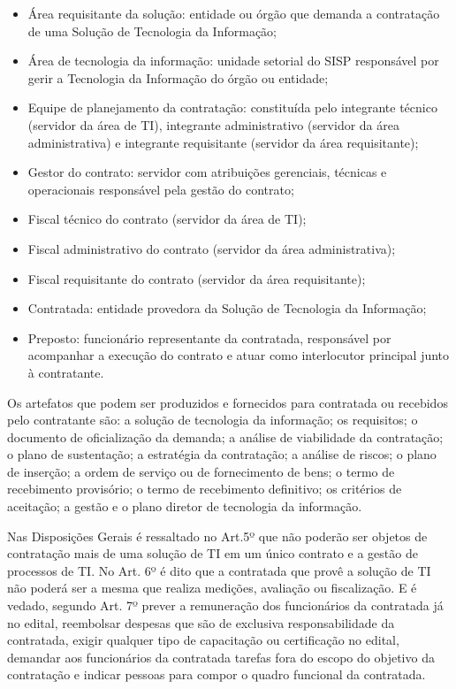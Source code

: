 \begin{itemize}
\item Área requisitante da solução: entidade ou órgão que demanda a contratação de uma Solução de Tecnologia da Informação; 
\item Área de tecnologia da informação: unidade setorial do SISP responsável por gerir a Tecnologia da Informação do órgão ou entidade;
\item Equipe de planejamento da contratação: constituída pelo integrante técnico (servidor da área de TI), integrante administrativo (servidor da área administrativa) e integrante requisitante (servidor da área requisitante);
\item Gestor do contrato: servidor com atribuições gerenciais, técnicas e operacionais responsável pela gestão do contrato; 
\item Fiscal técnico do contrato (servidor da área de TI); 
\item Fiscal administrativo do contrato (servidor da área administrativa); 
\item Fiscal requisitante do contrato (servidor da área requisitante);
\item Contratada: entidade provedora da Solução de Tecnologia da Informação;
\item Preposto: funcionário representante da contratada, responsável por acompanhar a execução do contrato e atuar como interlocutor principal junto à contratante.
\end{itemize}

Os artefatos que podem ser produzidos e fornecidos para contratada ou recebidos pelo contratante são: a solução de tecnologia da informação; os requisitos; o documento de oficialização da demanda; a análise de viabilidade da contratação; o plano de sustentação; a estratégia da contratação; a análise de riscos; o plano de inserção; a ordem de serviço ou de fornecimento de bens; o termo de recebimento provisório; o termo de recebimento definitivo; os critérios de aceitação; a gestão e o plano diretor de tecnologia da informação.

Nas Disposições Gerais é ressaltado no Art.5º que não poderão ser objetos de contratação mais de uma solução de TI em um único contrato e a gestão de processos de TI.  No Art. 6º é dito que a contratada que provê a solução de TI não poderá ser a mesma que realiza medições, avaliação ou fiscalização. E é vedado, segundo Art. 7º prever a remuneração dos funcionários da contratada já no edital, reembolsar despesas que são de exclusiva responsabilidade da contratada, exigir qualquer tipo de capacitação ou certificação no edital, demandar aos funcionários da contratada tarefas fora do escopo do objetivo da contratação  e indicar pessoas para compor o quadro funcional da contratada. 


